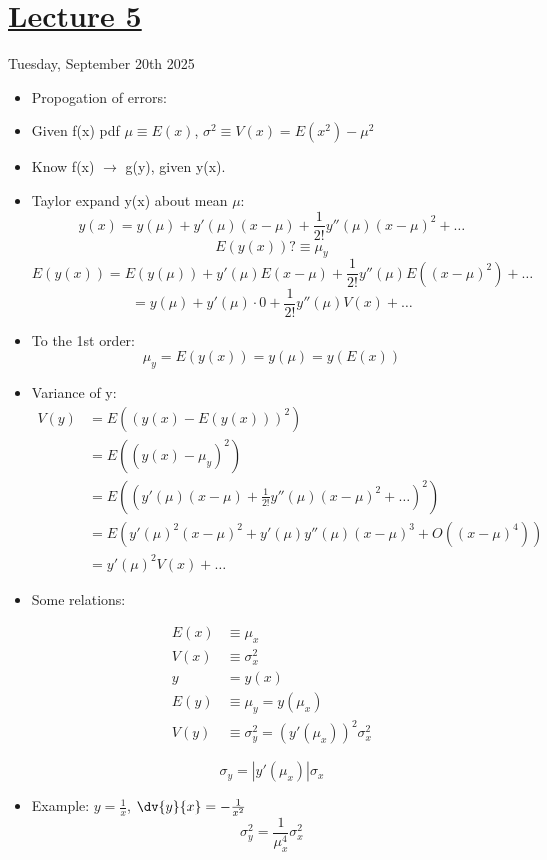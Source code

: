 \section[Lecture5]{\hyperlink{toc}{Lecture 5}}

Tuesday, September 20th 2025

\begin{itemize}
    \item Propogation of errors:
    \item Given f(x) pdf $\mu \equiv E(x)$, $\sigma^2 \equiv V(x) = E(x^2) - \mu^2$
    \item Know f(x) $\rightarrow$ g(y), given y(x).
    \item Taylor expand y(x) about mean $\mu$:
    \[ y(x) = y(\mu) + y'(\mu) (x - \mu) + \frac{1}{2!} y''(\mu) (x - \mu)^2 + \ldots \]
    \[ E(y(x)) ? \equiv \mu_y \]
    \[ E(y(x)) = E(y(\mu)) + y'(\mu) E(x - \mu) + \frac{1}{2!} y''(\mu) E((x - \mu)^2) + \ldots \]
    \[ = y(\mu) + y'(\mu) \cdot 0 + \frac{1}{2!} y''(\mu) V(x)+ \ldots \]

    \item To the 1st order:
    \[ \mu_y = E(y(x)) = y(\mu) = y(E(x)) \]

    \item Variance of y:
    \begin{align}
    V(y) &= E((y(x)-E(y(x)))^2)\\
    &= E((y(x) - \mu_y)^2) \\
    &= E((y'(\mu)(x-\mu) + \frac{1}{2!} y''(\mu)(x-\mu)^2 + \ldots)^2) \\
    &= E(y'(\mu)^2 (x-\mu)^2 + y'(\mu) y''(\mu)(x-\mu)^3 + O((x-\mu)^4)) \\
    &= y'(\mu)^2 V(x) + \ldots
    \end{align}

    \item Some relations:
    
    \begin{align*}
    E(x) &\equiv \mu_x \\
    V(x) &\equiv \sigma_x^2 \\
    y &= y(x) \\
    E(y) &\equiv \mu_y = y(\mu_x) \\
    V(y) &\equiv \sigma_y^2 = (y'(\mu_x))^2 \sigma_x^2
    \end{align*}

    \[ \sigma_y = |y'(\mu_x)| \sigma_x \]

    \item Example: $ y = \frac{1}{x}$, $\dv{y}{x} = -\frac{1}{x^2}$
    \[ \sigma^2_y = \frac{1}{\mu_x^4} \sigma_x^2 \]


\end{itemize}
